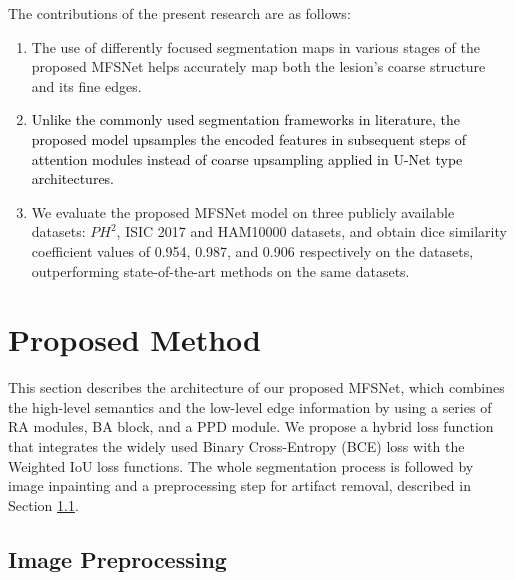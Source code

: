 \documentclass[review]{elsarticle}
\begin{document}
The contributions of the present research are as follows:
\begin{enumerate}
    \item The use of differently focused segmentation maps in various stages of the proposed MFSNet helps accurately map both the lesion's coarse structure and its fine edges.
    \item \textcolor{black}{Unlike the commonly used segmentation frameworks in literature, the proposed model upsamples the encoded features in subsequent steps of attention modules instead of coarse upsampling applied in U-Net type architectures.}
    \item We evaluate the proposed MFSNet model on three publicly available datasets: $PH^2$, ISIC 2017 and HAM10000 datasets, and obtain dice similarity coefficient values of 0.954, 0.987, and 0.906 respectively on the datasets, outperforming state-of-the-art methods on the same datasets.
\end{enumerate}











\section{Proposed Method}\label{method}
This section describes the architecture of our proposed MFSNet, which combines the high-level semantics and the low-level edge information by using a series of RA modules, BA block, and a PPD module. We propose a hybrid loss function that integrates the widely used Binary Cross-Entropy (BCE) loss with the Weighted IoU loss functions. The whole segmentation process is followed by image inpainting and a preprocessing step for artifact removal, described in Section \ref{preprocess}.

\subsection{Image Preprocessing}\label{preprocess}
\end{document}
